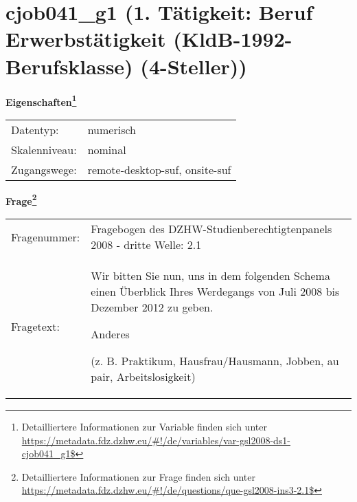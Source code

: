 
    \setcounter{footnote}{0}

    \vspace*{-1.8cm}
	\section{cjob041\_g1 (1. Tätigkeit: Beruf Erwerbstätigkeit (KldB-1992-Berufsklasse) (4-Steller))}
	\label{section:cjob041_g1}



    \vspace*{0.5cm}
    \noindent\textbf{Eigenschaften\footnote{Detailliertere Informationen zur Variable finden sich unter
		\url{https://metadata.fdz.dzhw.eu/\#!/de/variables/var-gsl2008-ds1-cjob041_g1$}}}\\
	\begin{tabularx}{\hsize}{@{}lX}
	Datentyp: & numerisch \\
	Skalenniveau: & nominal \\
	Zugangswege: &
	  remote-desktop-suf, 
	  onsite-suf
 \\
    \end{tabularx}



				\vspace*{0.5cm}
                \noindent\textbf{Frage\footnote{Detailliertere Informationen zur Frage finden sich unter
		              \url{https://metadata.fdz.dzhw.eu/\#!/de/questions/que-gsl2008-ins3-2.1$}}}\\
				\begin{tabularx}{\hsize}{@{}lX}
					Fragenummer: &
					  Fragebogen des DZHW-Studienberechtigtenpanels 2008 - dritte Welle:
					  2.1
 \\
					Fragetext: & Wir bitten Sie nun, uns in dem folgenden Schema einen Überblick Ihres Werdegangs von Juli 2008 bis Dezember 2012 zu geben.\par  Anderes\par  (z. B. Praktikum, Hausfrau/Hausmann, Jobben, au pair, Arbeitslosigkeit) \\
				\end{tabularx}





